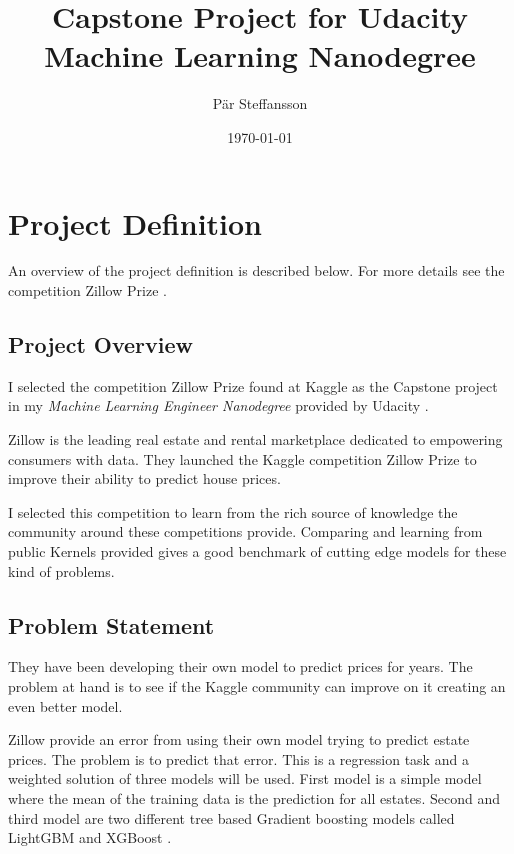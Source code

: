 \documentclass[a4paper]{article}
\title{Capstone Project for Udacity Machine Learning Nanodegree}
\author{Pär Steffansson}
\date{\today}
\begin{document}
\maketitle

\tableofcontents

\section{Project Definition}
An overview of the project definition is described below. For more details see the competition Zillow Prize \cite{zillowprize}.

\subsection{Project Overview}
%
%
I selected the competition Zillow Prize \cite{zillowprize} found at Kaggle \cite{kaggle} as the Capstone project in my \textit{Machine Learning Engineer Nanodegree} provided by Udacity \cite{udacity}.

Zillow \cite{zillow} is the leading real estate and rental marketplace dedicated to empowering consumers with data. They launched the Kaggle competition Zillow Prize \cite{zillowprize} to improve their ability to predict house prices.

I selected this competition to learn from the rich source of knowledge the community around these competitions provide. Comparing and learning from public Kernels provided gives a good benchmark of cutting edge models for these kind of problems.

\subsection{Problem Statement}
%
%
They have been developing their own model to predict prices for years. The problem at hand is to see if the Kaggle community can improve on it creating an even better model. 

Zillow provide an error from using their own model trying to predict estate prices. The problem is to predict that error. This is a regression task and a weighted solution of three models will be used. First model is a simple model where the mean of the training data is the prediction for all estates. Second and third model are two different tree based Gradient boosting models called LightGBM \cite{lightgbm} and XGBoost \cite{xgboost}.
\end{document}
